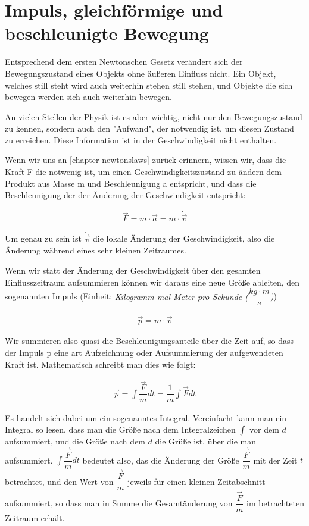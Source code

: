\section{Impuls, gleichförmige und beschleunigte Bewegung}
\label{chapter-impuls}
Entsprechend dem ersten Newtonschen Gesetz verändert sich der Bewegungszustand eines Objekts ohne äußeren Einfluss nicht. Ein Objekt, welches still steht wird auch weiterhin stehen still stehen, und Objekte die sich bewegen werden sich auch weiterhin bewegen. 

An vielen Stellen der Physik ist es aber wichtig, nicht nur den Bewegungszustand zu kennen, sondern auch den "Aufwand", der notwendig ist, um diesen Zustand zu erreichen. Diese Information ist in der Geschwindigkeit nicht enthalten.

Wenn wir uns an \ref{chapter-newtonslaws} zurück erinnern, wissen wir, dass die Kraft F die notwenig ist, um einen Geschwindigkeitszustand zu ändern dem Produkt aus Masse m und Beschleunigung a entspricht, und dass die Beschleunigung der der Änderung der Geschwindigkeit entspricht: 

\begin{eqnarray}
\vec{F}=m \cdot \vec{a}=m \cdot \dot{\vec{v}}
\end{eqnarray}

Um genau zu sein ist $\dot{\vec{v}}$ die lokale Änderung der Geschwindigkeit, also die Änderung während eines sehr kleinen Zeitraumes. 

Wenn wir statt der Änderung der Geschwindigkeit über den gesamten Einflusszeitraum aufsummieren können wir daraus eine neue Größe ableiten, den sogenannten Impuls (Einheit: \textit{Kilogramm mal Meter pro Sekunde ($\dfrac{kg \cdot m}{s}$)})

\begin{eqnarray}
\vec{p}=m \cdot \vec{v}
\end{eqnarray}

Wir summieren also quasi die Beschleunigungsanteile über die Zeit auf, so dass der Impuls p eine art Aufzeichnung oder Aufsummierung der aufgewendeten Kraft ist. Mathematisch schreibt man dies wie folgt:

\begin{eqnarray}
\vec{p}=\int \dfrac{\vec{F}}{m} dt =\dfrac{1}{m}\int \vec{F} dt 
\end{eqnarray}

Es handelt sich dabei um ein sogenanntes Integral. Vereinfacht kann man ein Integral so lesen, dass man die Größe nach dem Integralzeichen $\int$ vor dem $d$ aufsummiert, und die Größe nach dem $d$ die Grüße ist, über die man aufsummiert. $\int \dfrac{\vec{F}}{m} dt$ bedeutet also, das die Änderung der Größe $\dfrac{\vec{F}}{m}$ mit der Zeit $t$ betrachtet, und den Wert von $\dfrac{\vec{F}}{m}$ jeweils für einen kleinen Zeitabschnitt aufsummiert, so dass man in Summe die Gesamtänderung von $\dfrac{\vec{F}}{m}$ im betrachteten Zeitraum erhält.

